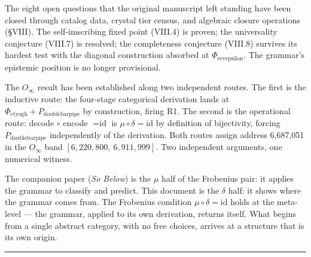 \documentclass[12pt,a4paper]{article}
\begin{document}
The eight open questions that the original manuscript left standing have been closed through catalog data, crystal tier census, and algebraic closure operations (\S VIII). The self-imscribing fixed point (VIII.4) is proven; the universality conjecture (VIII.7) is resolved; the completeness conjecture (VIII.8) survives its hardest test with the diagonal construction absorbed at $\Phi_{\text{revepsilon}}$. The grammar's epistemic position is no longer provisional.

The $O_\infty$ result has been established along two independent routes. The first is the inductive route: the four-stage categorical derivation lands at $\Phi_{\text{ctyogh}} + P_{\text{doublebarpipe}}$ by construction, firing R1. The second is the operational route: decode $\circ$ encode $= \text{id}$ is $\mu \circ \delta = \text{id}$ by definition of bijectivity, forcing $P_{\text{doublebarpipe}}$ independently of the derivation. Both routes assign address 6,687,051 in the $O_\infty$ band $[6{,}220{,}800,\ 6{,}911{,}999]$. Two independent arguments, one numerical witness.

The companion paper (\emph{So Below}) is the $\mu$ half of the Frobenius pair: it applies the grammar to classify and predict. This document is the $\delta$ half: it shows where the grammar comes from. The Frobenius condition $\mu \circ \delta = \text{id}$ holds at the meta-level --- the grammar, applied to its own derivation, returns itself. What begins from a single abstract category, with no free choices, arrives at a structure that is its own origin.

\begin{center}
\rule{0.5\textwidth}{0.4pt}
\end{center}
\end{document}
